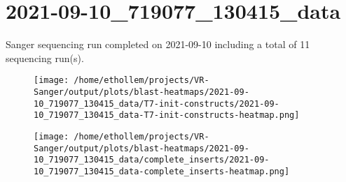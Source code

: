 \section{2021-09-10\_719077\_130415\_data}

    Sanger sequencing run completed on 2021-09-10
    including a total of 11 sequencing
    run(s).
    

    \begin{figure}[!h]
        \texttt{[image: /home/ethollem/projects/VR-Sanger/output/plots/blast-heatmaps/2021-09-10\_719077\_130415\_data/T7-init-constructs/2021-09-10\_719077\_130415\_data-T7-init-constructs-heatmap.png]}
        \centering
    \end{figure}


    \begin{figure}[!h]
        \texttt{[image: /home/ethollem/projects/VR-Sanger/output/plots/blast-heatmaps/2021-09-10\_719077\_130415\_data/complete\_inserts/2021-09-10\_719077\_130415\_data-complete\_inserts-heatmap.png]}
        \centering
    \end{figure}

\pagebreak